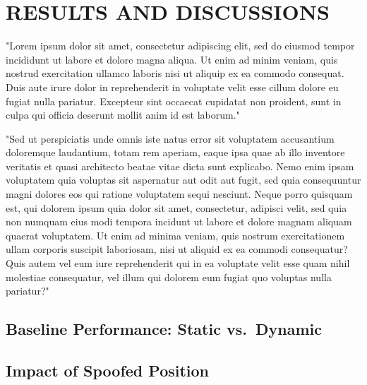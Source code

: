 
\section{RESULTS AND DISCUSSIONS} \label{sec:results}


    "Lorem ipsum dolor sit amet, consectetur adipiscing elit, sed do eiusmod tempor incididunt ut labore et dolore magna aliqua. Ut enim ad minim veniam, quis nostrud exercitation ullamco laboris nisi ut aliquip ex ea commodo consequat. Duis aute irure dolor in reprehenderit in voluptate velit esse cillum dolore eu fugiat nulla pariatur. Excepteur sint occaecat cupidatat non proident, sunt in culpa qui officia deserunt mollit anim id est laborum."
    
    "Sed ut perspiciatis unde omnis iste natus error sit voluptatem accusantium doloremque laudantium, totam rem aperiam, eaque ipsa quae ab illo inventore veritatis et quasi architecto beatae vitae dicta sunt explicabo. Nemo enim ipsam voluptatem quia voluptas sit aspernatur aut odit aut fugit, sed quia consequuntur magni dolores eos qui ratione voluptatem sequi nesciunt. Neque porro quisquam est, qui dolorem ipsum quia dolor sit amet, consectetur, adipisci velit, sed quia non numquam eius modi tempora incidunt ut labore et dolore magnam aliquam quaerat voluptatem. Ut enim ad minima veniam, quis nostrum exercitationem ullam corporis suscipit laboriosam, nisi ut aliquid ex ea commodi consequatur? Quis autem vel eum iure reprehenderit qui in ea voluptate velit esse quam nihil molestiae consequatur, vel illum qui dolorem eum fugiat quo voluptas nulla pariatur?"
    
    \subsection{Baseline Performance: Static vs.\ Dynamic}
    


    \subsection{Impact of Spoofed Position}
        
